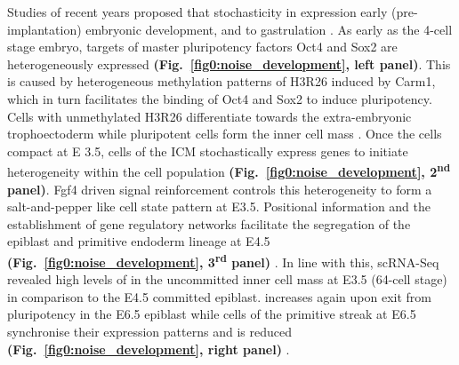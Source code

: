 Studies of recent years proposed that stochasticity in expression  early (pre-implantation) embryonic development, and to gastrulation \citep{Dietrich2007}. 
As early as the 4-cell stage embryo, targets of master pluripotency factors Oct4 and Sox2 are heterogeneously expressed \textbf{(Fig.~\ref{fig0:noise_development}, left panel)}. 
This is caused by heterogeneous methylation patterns of \gls{H3R26} induced by \gls{Carm1}, which in turn facilitates the binding of Oct4 and Sox2 to induce pluripotency. 
Cells with unmethylated H3R26 differentiate towards the extra-embryonic trophoectoderm while pluripotent cells form the inner cell mass \citep{Goolam2016}. 
Once the cells compact at \gls{E} 3.5, cells of the \gls{ICM} stochastically express genes to initiate heterogeneity within the cell population \textbf{(Fig.~\ref{fig0:noise_development}, 2\textsuperscript{nd} panel)}. 
Fgf4 driven signal reinforcement controls this heterogeneity to form a salt-and-pepper like cell state pattern at E3.5. 
Positional information and the establishment of gene regulatory networks facilitate the segregation of the epiblast and primitive endoderm lineage at E4.5 \textbf{(Fig.~\ref{fig0:noise_development}, 3\textsuperscript{rd} panel)} \citep{Ohnishi2014}. 
In line with this, scRNA-Seq revealed high levels of  in the uncommitted inner cell mass at E3.5 (64-cell stage) in comparison to the E4.5 committed epiblast. 
 increases again upon exit from pluripotency in the E6.5 epiblast while cells of the primitive streak at E6.5 synchronise their expression patterns and  is reduced \textbf{(Fig.~\ref{fig0:noise_development}, right panel)} \citep{Mohammed2017}. \\


